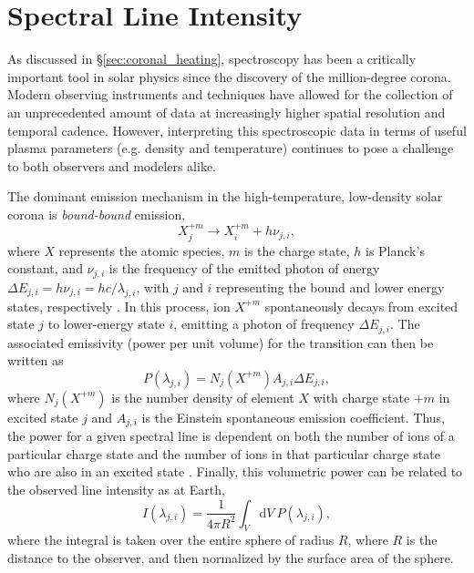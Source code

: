 \section{Spectral Line Intensity}
\label{sec:spectral_lines}
%
\par As discussed in \S\ref{sec:coronal_heating}, spectroscopy has been a critically important tool in solar physics since the discovery of the million-degree corona. Modern observing instruments and techniques have allowed for the collection of an unprecedented amount of data at increasingly higher spatial resolution and temporal cadence. However, interpreting this spectroscopic data in terms of useful plasma parameters (e.g. density and temperature) continues to pose a challenge to both observers and modelers alike.
%
\par The dominant emission mechanism in the high-temperature, low-density solar corona is \textit{bound-bound} emission,
\begin{equation}
	\label{eq:bound_bound}
	X_j^{+m}\to X_i^{+m} + h\nu_{j,i},
\end{equation}
where $X$ represents the atomic species, $m$ is the charge state, $h$ is Planck's constant, and $\nu_{j,i}$ is the frequency of the emitted photon of energy $\Delta E_{j,i} = h\nu_{j,i}=hc/\lambda_{j,i}$, with $j$ and $i$ representing the bound and lower energy states, respectively \citep{mason_spectroscopic_1994}. In this process, ion $X^{+m}$ spontaneously decays from excited state $j$ to lower-energy state $i$, emitting a photon of frequency $\Delta E_{j,i}$. The associated emissivity (power per unit volume) for the transition can then be written as 
\begin{equation}
	\label{eq:emissivity}
	P(\lambda_{j,i})=N_j(X^{+m})A_{j,i}\Delta E_{j,i},
\end{equation}
where $N_j(X^{+m})$ is the number density of element $X$ with charge state $+m$ in excited state $j$ and $A_{j,i}$ is the Einstein spontaneous emission coefficient. Thus, the power for a given spectral line is dependent on both the number of ions of a particular charge state and the number of ions in that particular charge state who are also in an excited state \citep{mason_spectroscopic_1994,bradshaw_collisional_2013}. Finally, this volumetric power can be related to the observed line intensity as at Earth,
\begin{equation}
	\label{eq:intensity}
	I(\lambda_{j,i}) = \frac{1}{4\pi R^2}\int_V \mathrm{d}V~P(\lambda_{j,i}),
\end{equation}
where the integral is taken over the entire sphere of radius $R$, where $R$ is the distance to the observer, and then normalized by the surface area of the sphere.

